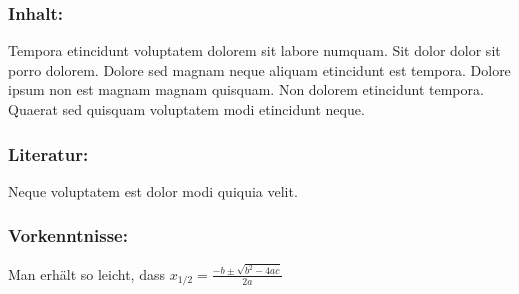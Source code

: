 \subsubsection*{\Large Inhalt:}
Tempora etincidunt voluptatem dolorem sit labore numquam. Sit dolor dolor sit porro dolorem. Dolore sed magnam neque aliquam etincidunt est tempora. Dolore ipsum non est magnam magnam quisquam. Non dolorem etincidunt tempora. Quaerat sed quisquam voluptatem modi etincidunt neque.
\subsubsection*{\Large Literatur:}
Neque voluptatem est dolor modi quiquia velit.
\subsubsection*{\Large Vorkenntnisse:}
Man erhält so leicht, dass $x_{1/2} = \frac{-b \pm \sqrt{b^2 - 4ac}}{2a}$
